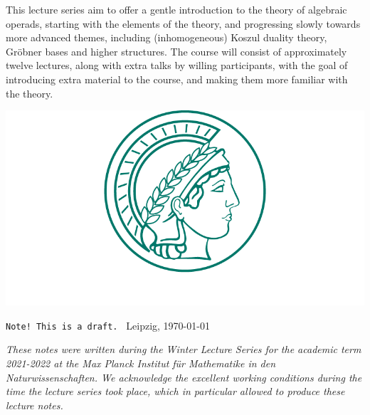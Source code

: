 \documentclass[fleqn, a4paper, twoside]{article}
\title{\vspace{-5 em}\setstretch{0.85}{\textbf{Algebraic operads, Koszul duality and Gr\"obner bases: an introduction}}}
\author{P. Tamaroff}
\date{August 22 and 24}
\newcommand{\0}{\langle 0\rangle}
\DeclareRobustCommand{\[}{\begin{equation}}%
\DeclareRobustCommand{\]}{\end{equation}}%
\theoremstyle{mytheorem}
\theoremstyle{introthm}
\theoremstyle{mydefinition}
\theoremstyle{mydefinition2}
\theoremstyle{plain} %
\newcommand{\?}{\,?\,}
\theoremstyle{mytheorem}
\theoremstyle{plain} %
\renewenvironment{abstract}{%
\small\begin{center}
\begin{minipage}{.9\textwidth}
}
{\par\noindent\end{minipage}\end{center}\vspace{3 em}}
\newcommand\blankpage{%
    \null
    \thispagestyle{empty}%
    \newpage}
\begin{document}
\pagecolor{pagecolor}
\maketitle


\thispagestyle{empty}

\begin{abstract}
This lecture series aim to offer a gentle introduction
to the theory of algebraic operads, starting with the
elements of the theory, and progressing slowly towards
more advanced themes, including (inhomogeneous)
Koszul duality theory, Gr\"obner bases and higher
structures. The course will consist of approximately
twelve lectures, along with extra talks by
willing participants, with the goal of introducing extra
material to the course, and making them more
familiar with the theory.
\end{abstract}

\vspace{2 cm}

\begin{center}
\includegraphics[scale=.35]{logoMPG.png}
\end{center}

\vfill

\vfill

 \texttt{Note! This is a draft. } \hfill	Leipzig, \today


\afterpage{\blankpage}

\newpage

\vspace*{\fill} 
\emph{These notes were written during the Winter Lecture
Series for the academic term 2021-2022 at the \emph{Max
Planck Institut f\"ur Mathematike in den Naturwissenschaften}.
We acknowledge the excellent working
conditions during the time the lecture series took place,
which in particular allowed to produce these lecture notes. }
\vspace*{\fill} 
 \afterpage{\blankpage}
\end{document}
